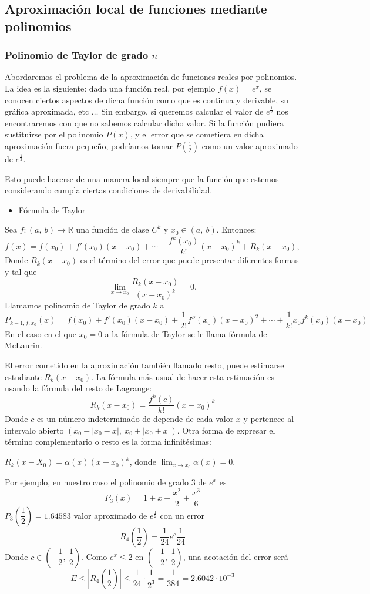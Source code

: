 \subsection{Aproximación local de funciones mediante polinomios}
\subsubsection{Polinomio de Taylor de grado $n$}
Abordaremos el problema de la aproximación de funciones reales por polinomios. La idea es la siguiente: dada una función real, por ejemplo $f(x)=e^x$, se conocen ciertos aspectos de dicha función como que es continua y derivable, su gráfica aproximada, etc $\hdots$ Sin embargo, si queremos calcular el valor de $e^{\frac{1}{2}}$ nos encontraremos con que no sabemos calcular dicho valor. Si la función pudiera sustituirse por el polinomio $P(x)$, y el error que se cometiera en dicha aproximación fuera pequeño, podríamos tomar $P\left(\frac{1}{2}\right)$ como un valor aproximado de $e^{\frac{1}{2}}$.

Esto puede hacerse de una manera local siempre que la función que estemos considerando cumpla ciertas condiciones de derivabilidad.

\begin{itemize}[label=\color{red}\textbullet, leftmargin=*]
	\item \color{lightblue} Fórmula de Taylor
\end{itemize}
Sea $f:(a,~b)\rightarrow\mathbb{R}$ una función de clase $C^k$ y $x_0\in(a,~b)$. Entonces: \[ f(x)=f(x_0)+f'(x_0)(x-x_0)+\cdots+\dfrac{f^k(x_0)}{k!}(x-x_0)^k+R_k(x-x_0), \]
Donde $R_k(x-x_0)$ es el término del error que puede presentar diferentes formas y tal que \[ \lim_{x\to x_0}\dfrac{R_{k}(x-x_0)}{(x-x_0)^k}=0. \]
Llamamos polinomio de Taylor de grado $k$ a \[ P_{k-1,f,x_0}(x)=f(x_0)+f'(x_0)(x-x_0)+\dfrac{1}{2!}f''(x_0)(x-x_0)^2+\cdots+\dfrac{1}{k!}x_0f^k(x_0)(x-x_0) \]
En el caso en el que $x_0=0$ a la fórmula de Taylor se le llama fórmula de McLaurin.

El error cometido en la aproximación también llamado resto, puede estimarse estudiante $R_k(x-x_0)$. La fórmula más usual de hacer esta estimación es usando la fórmula del resto de Lagrange: \[ R_k(x-x_0)=\dfrac{f^k(c)}{k!}(x-x_0)^k \]
Donde $c$ es un número indeterminado de depende de cada valor $x$ y pertenece al intervalo abierto $(x_0-|x_0-x|,~x_0+|x_0+x|)$. Otra forma de expresar el término complementario o resto es la forma infinitésimas: \begin{center}
	$R_k(x-X_0)=\alpha(x)(x-x_0)^k$, donde $\lim_{x\to x_0}\alpha(x)=0$.
\end{center}
Por ejemplo, en nuestro caso el polinomio de grado 3 de $e^x$ es \[ P_3(x)=1+x+\dfrac{x^2}{2}+\dfrac{x^3}{6} \]$P_3\left(\dfrac{1}{2}\right)=1.64583$ valor aproximado de $e^{\frac{1}{2}}$ con un error \[ R_4\left(\dfrac{1}{2}\right)=\dfrac{1}{24}e^c\dfrac{1}{24} \]
Donde $c\in\left(-\dfrac{1}{2},~\dfrac{1}{2}\right)$. Como $e^x\le 2$ en $\left(-\dfrac{1}{2},~\dfrac{1}{2}\right)$, una acotación del error será \[ E\le\left|R_4\left(\dfrac{1}{2}\right)\right| \le\dfrac{1}{24}\cdot\dfrac{1}{2^3}=\dfrac{1}{384}=2.6042\cdot10^{-3}\]

